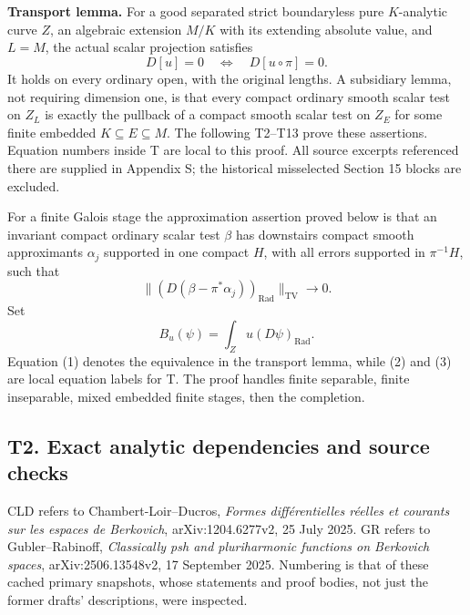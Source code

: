 \documentclass[
  10pt,
]{article}
\begin{document}
\textbf{Transport lemma.} For a good separated strict boundaryless pure
\(K\)-analytic curve \(Z\), an algebraic extension \(M/K\) with its
extending absolute value, and \(L=\widehat M\), the actual scalar
projection satisfies \[
                  D[u]=0\quad\Longleftrightarrow\quad D[u\circ\pi]=0.
\] It holds on every ordinary open, with the original lengths. A
subsidiary lemma, not requiring dimension one, is that every compact
ordinary smooth scalar test on \(Z_L\) is exactly the pullback of a
compact smooth scalar test on \(Z_E\) for some finite embedded
\(K\subseteq E\subseteq M\). The following T2--T13 prove these
assertions. Equation numbers inside T are local to this proof. All
source excerpts referenced there are supplied in Appendix S; the
historical misselected Section 15 blocks are excluded.

For a finite Galois stage the approximation assertion proved below is
that an invariant compact ordinary scalar test \(\beta\) has downstairs
compact smooth approximants \(\alpha_j\) supported in one compact \(H\),
with all errors supported in \(\pi^{-1}H\), such that \[
 \big\|(D(\beta-\pi^*\alpha_j))_{\mathrm{Rad}}\big\|_{\mathrm{TV}}\to0.\tag{2}
\] Set \[
 B_u(\psi)=\int_Zu(D\psi)_{\mathrm{Rad}}.\tag{3}
\] Equation (1) denotes the equivalence in the transport lemma, while
(2) and (3) are local equation labels for T. The proof handles finite
separable, finite inseparable, mixed embedded finite stages, then the
completion.

\subsection{T2. Exact analytic dependencies and source
checks}\label{t2.-exact-analytic-dependencies-and-source-checks}

CLD refers to Chambert-Loir--Ducros, \emph{Formes différentielles
réelles et courants sur les espaces de Berkovich}, arXiv:1204.6277v2, 25
July 2025. GR refers to Gubler--Rabinoff, \emph{Classically psh and
pluriharmonic functions on Berkovich spaces}, arXiv:2506.13548v2, 17
September 2025. Numbering is that of these cached primary snapshots,
whose statements and proof bodies, not just the former drafts'
descriptions, were inspected.
\end{document}
